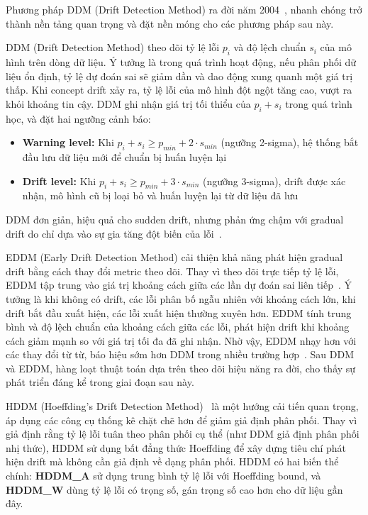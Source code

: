 Phương pháp DDM (Drift Detection Method) ra đời năm 2004~\cite{gama2004learning}, nhanh chóng trở thành nền tảng quan trọng và đặt nền móng cho các phương pháp sau này.

DDM (Drift Detection Method) theo dõi tỷ lệ lỗi $p_i$ và độ lệch chuẩn $s_i$ của mô hình trên dòng dữ liệu.
Ý tưởng là trong quá trình hoạt động, nếu phân phối dữ liệu ổn định, tỷ lệ dự đoán sai sẽ giảm dần và dao động xung quanh một giá trị thấp.
Khi concept drift xảy ra, tỷ lệ lỗi của mô hình đột ngột tăng cao, vượt ra khỏi khoảng tin cậy.
DDM ghi nhận giá trị tối thiểu của $p_i + s_i$ trong quá trình học, và đặt hai ngưỡng cảnh báo:
\begin{itemize}
	\item \textbf{Warning level:} Khi $p_i + s_i \geq p_{min} + 2 \cdot s_{min}$ (ngưỡng 2-sigma), hệ thống bắt đầu lưu dữ liệu mới để chuẩn bị huấn luyện lại
	\item \textbf{Drift level:} Khi $p_i + s_i \geq p_{min} + 3 \cdot s_{min}$ (ngưỡng 3-sigma), drift được xác nhận, mô hình cũ bị loại bỏ và huấn luyện lại từ dữ liệu đã lưu
\end{itemize}

DDM đơn giản, hiệu quả cho sudden drift, nhưng phản ứng chậm với gradual drift do chỉ dựa vào sự gia tăng đột biến của lỗi~\cite{gama2004learning}.

EDDM (Early Drift Detection Method) cải thiện khả năng phát hiện gradual drift bằng cách thay đổi metric theo dõi. Thay vì theo dõi trực tiếp tỷ lệ lỗi, EDDM tập trung
vào giá trị khoảng cách giữa các lần dự đoán sai liên tiếp~\cite{baena2006early}. Ý tưởng là khi không có drift, các lỗi phân bố ngẫu nhiên với
khoảng cách lớn, khi drift bắt đầu xuất hiện, các lỗi xuất hiện thường xuyên hơn. EDDM tính trung bình và độ lệch chuẩn của khoảng cách giữa các lỗi,
phát hiện drift khi khoảng cách giảm mạnh so với giá trị tối đa đã ghi nhận. Nhờ vậy, EDDM nhạy hơn với các thay đổi từ từ, báo hiệu sớm
hơn DDM trong nhiều trường hợp~\cite{baena2006early}. Sau DDM và EDDM, hàng loạt thuật toán dựa trên theo dõi hiệu năng ra đời, cho thấy sự phát
triển đáng kể trong giai đoạn sau này.

HDDM (Hoeffding's Drift Detection Method)~\cite{friasblanco2015hddm} là một hướng cải tiến quan trọng, áp dụng các công cụ thống kê chặt chẽ hơn để giảm
giả định phân phối. Thay vì giả định rằng tỷ lệ lỗi tuân theo phân phối cụ thể (như DDM giả định phân phối nhị thức), HDDM sử dụng bất đẳng thức Hoeffding để xây dựng tiêu chí phát hiện drift mà không cần giả định về dạng phân phối. HDDM có hai biến thể chính: \textbf{HDDM\_A} sử dụng trung bình tỷ lệ lỗi với Hoeffding bound, và \textbf{HDDM\_W} dùng tỷ lệ lỗi có trọng số, gán trọng số cao hơn cho dữ liệu gần đây.

